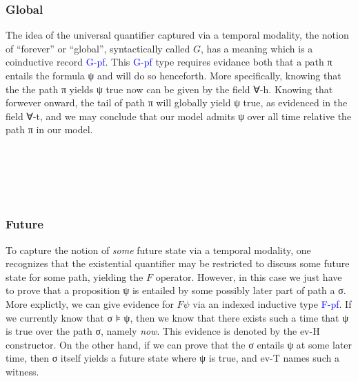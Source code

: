 \documentclass[a4paper, 11pt]{article}
\newcommand{\blue}[1]{\textcolor{blue}{#1}}
\newcommand{\green}[1]{\textcolor{hooker\'sgreen}{#1}}
\newcommand{\pink}[1]{\textcolor{hotmagenta}{#1}}
\begin{document}
\subsubsection{Global}

The idea of the universal quantifier captured via a temporal modality, the
notion of ``forever'' or ``global'', syntactically called $G$, has a meaning
which is a coinductive record \blue{G-pf}. This \blue{G-pf} type requires
evidance both that a path π entails the formula ψ and will do so henceforth.
More specifically, knowing that the the path π yields ψ true now can be given by
the field \pink{∀-h}. Knowing that forwever onward, the tail of path π will
globally yield ψ true, as evidenced in the field \pink{∀-t}, and we may conclude that our
model admits ψ over all time relative the path π in our model.

\begin{code}%
%
\>[2]\AgdaSpace{}%
\AgdaSpace{}%
\AgdaSymbol{(}\AgdaSpace{}%
\AgdaSymbol{:}\AgdaSpace{}%
\AgdaSpace{}%
\AgdaSpace{}%
\AgdaSymbol{)}\AgdaSpace{}%
\AgdaSymbol{(}\AgdaSpace{}%
\AgdaSymbol{:}\AgdaSpace{}%
\AgdaSymbol{)}\AgdaSpace{}%
\AgdaSymbol{:}\AgdaSpace{}%
\AgdaSpace{}%
\<%
\\
\>[2][@{}l@{\AgdaIndent{0}}]%
\>[4]\<%
\\
%
\>[4]\<%
\\
\>[4][@{}l@{\AgdaIndent{0}}]%
\>[6]\AgdaSpace{}%
\AgdaSymbol{:}\AgdaSpace{}%
\AgdaSpace{}%
\<%
\\
%
\>[6]\AgdaSpace{}%
\AgdaSymbol{:}\AgdaSpace{}%
\AgdaSpace{}%
\AgdaSpace{}%
\AgdaSymbol{(}\AgdaSpace{}%
\AgdaSymbol{)}\<%
\end{code}

\subsubsection{Future}

To capture the notion of \emph{some} future state via a temporal modality, one
recognizes that the existential quantifier may be restricted to discuss some
future state for some path, yielding the $F$ operator. However, in this case we
just have to prove that a proposition ψ is entailed by some possibly later part
of path a σ. More explictly, we can give evidence for $F \psi$ via an indexed
inductive type \blue{F-pf}. If we currently know that σ ⊧ ψ, then we know that
there exists such a time that ψ is true over the path σ, namely \emph{now}. This
evidence is denoted by the \green{ev-H} constructor. On the other hand, if we
can prove that the σ entails ψ at some later time, then σ itself yields a future
state where ψ is true, and \green{ev-T} names such a witness.
\end{document}
